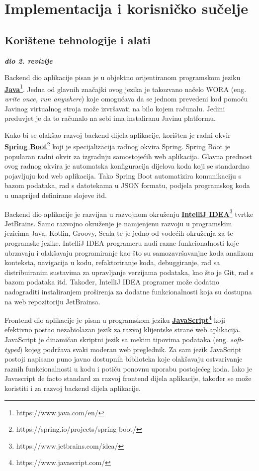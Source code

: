 \chapter{Implementacija i korisničko sučelje}
		
		
		\section{Korištene tehnologije i alati}
		
			\textbf{\textit{dio 2. revizije}}
			
			Backend dio aplikacije pisan je u objektno orijentiranom programskom jeziku  \href{https://www.java.com/en/}{\textbf{Java}}\footnote{https://www.java.com/en/}. Jedna od glavnih značajki ovog jezika je takozvano načelo WORA (eng. \textit{write once, run anywhere}) koje omogućava da se jednom prevedeni kod pomoću Javinog virtualnog stroja može izvršavati na bilo kojem računalu. Jedini preduvjet je da to računalo na sebi ima instaliranu Javinu platformu.
			
			Kako bi se olakšao razvoj backend dijela aplikacije, korišten je radni okvir \href{https://spring.io/projects/spring-boot/}{\textbf{Spring Boot}}\footnote{https://spring.io/projects/spring-boot/} koji je specijalizacija radnog okvira Spring. Spring Boot je popularan radni okvir za izgradnju samostojećih web aplikacija. Glavna prednost ovog radnog okvira je automatska konfiguracija dijelova koda koji se standardno pojavljuju kod web aplikacija. Tako Spring Boot automatizira komunikaciju s bazom podataka, rad s datotekama u JSON formatu, podjela programskog koda u unaprijed definirane slojeve itd.
			
			Backend dio aplikacije je razvijan u razvojnom okruženju \href{https://www.jetbrains.com/idea/}{\textbf{IntelliJ IDEA}}\footnote{https://www.jetbrains.com/idea/} tvrtke JetBrains. Samo razvojno okruženje je namjenjenu razvoju u programskim jezicima Java, Kotlin, Groovy, Scala te je jedno od vodećih okruženja za te programske jezike. IntelliJ IDEA programeru nudi razne funkcionalnosti koje ubrzavaju i olakšavaju programiranje kao što su samozavršavanjne koda analizom konteksta, navigacija u kodu, refaktoriranje koda, debuggiranje, rad sa distribuiranim sustavima za upravljanje verzijama podataka, kao što je Git, rad s bazom podataka itd. Također, IntelliJ IDEA programer može dodatno nadograditi instaliranjem proširenja za dodatne funkcionalnosti koja su dostupna na web repozitoriju JetBrainsa.
			
			Frontend dio aplikacije je pisan u programskom jeziku \href{https://www.javascript.com/}{\textbf{JavaScript}}\footnote{https://www.javascript.com/} koji efektivno postao nezabiolazan jezik za razvoj klijentske strane web aplikacija. JavaScript je dinamičan skriptni jezik sa mekim tipovima podataka (eng. \textit{soft-typed}) kojeg podržava svaki moderan web preglednik. Za sam jezik JavaScript postoji napisano puno javno dostupnih biblioteka koje olakšavaju ostvarivanje raznih funkcionalnosti u kodu i potiču ponovnu uporabu postojećeg koda. Iako je Javascript de facto standard za razvoj frontend dijela aplikacije, također se može koristiti i za razvoj backend dijela aplikacije.
			
